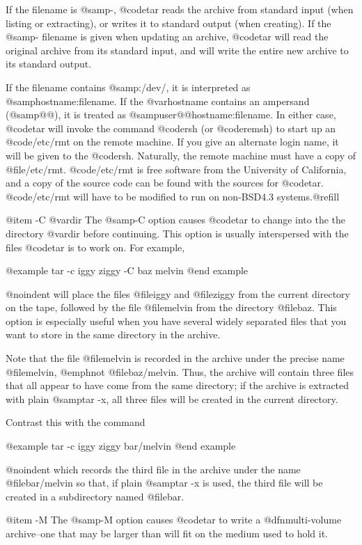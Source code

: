 If the filename is @samp{-}, @code{tar} reads the archive from
standard input (when listing or extracting), or writes it to standard
output (when creating).  If the @samp{-} filename is given when
updating an archive, @code{tar} will read the original archive from
its standard input, and will write the entire new archive to its
standard output.

If the filename contains @samp{:/dev/}, it is interpreted as
@samp{hostname:filename}.  If the @var{hostname} contains an ampersand
(@samp{@@}), it is treated as @samp{user@@hostname:filename}.
In either case, @code{tar} will invoke the command @code{rsh}
(or @code{remsh}) to start
up an @code{/etc/rmt} on the remote machine.  If you give an alternate login
name, it will be given to the @code{rsh}.  Naturally, the remote machine must
have a copy of @file{/etc/rmt}.  @code{/etc/rmt} is free software
from the University of California, and a copy of the source code can be found
with the sources for @code{tar}.  @code{/etc/rmt} will have to be modified to
run on non-BSD4.3 systems.@refill

@item -C @var{dir}
The @samp{-C} option causes @code{tar} to change into the the
directory @var{dir} before continuing.  This option is usually
interspersed with the files @code{tar} is to work on.  For example,

@example 
tar -c iggy ziggy -C baz melvin
@end example

@noindent
will place the files @file{iggy} and @file{ziggy} from the current
directory on the tape, followed by the file @file{melvin} from the
directory @file{baz}.  This option is especially useful when you have
several widely separated files that you want to store in the same
directory in the archive.

Note that the file @file{melvin} is recorded in the archive under the
precise name @file{melvin}, @emph{not} @file{baz/melvin}.  Thus, the
archive will contain three files that all appear to have come from the
same directory; if the archive is extracted with plain @samp{tar -x},
all three files will be created in the current directory.

Contrast this with the command

@example
tar -c iggy ziggy bar/melvin
@end example

@noindent
which records the third file in the archive under the name @file{bar/melvin}
so that, if plain @samp{tar -x} is used, the third file will be created
in a subdirectory named @file{bar}.

@item -M
The @samp{-M} option causes @code{tar} to write a @dfn{multi-volume}
archive--one that may be larger than will fit on the medium used to
hold it.

